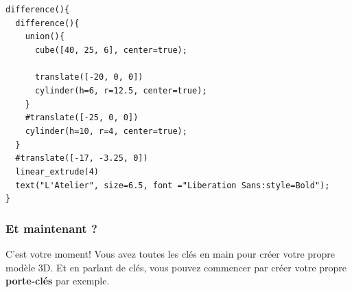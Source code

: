 \begin{scriptsize}
\begin{tcolorbox}[title=Code]
\verb|difference(){|\\
\verb|  difference(){|\\
\verb|    union(){|\\
\verb|      cube([40, 25, 6], center=true);|\\
\verb|      |\\
\verb|      translate([-20, 0, 0])|\\
\verb|      cylinder(h=6, r=12.5, center=true);|\\
\verb|    }|\\
\verb|    #translate([-25, 0, 0])|\\
\verb|    cylinder(h=10, r=4, center=true);|\\
\verb|  }|\\
\verb|  #translate([-17, -3.25, 0])|\\
\verb|  linear_extrude(4)|\\
\verb|  text("L'Atelier", size=6.5, font ="Liberation Sans:style=Bold");|\\
\verb|}|
\end{tcolorbox}
\end{scriptsize}


\subsubsection{Et maintenant ?}

C'est votre moment!
Vous avez toutes les clés en main pour créer votre propre modèle 3D.
Et en parlant de clés, vous pouvez commencer par créer votre propre \textbf{porte-clés} par exemple.


